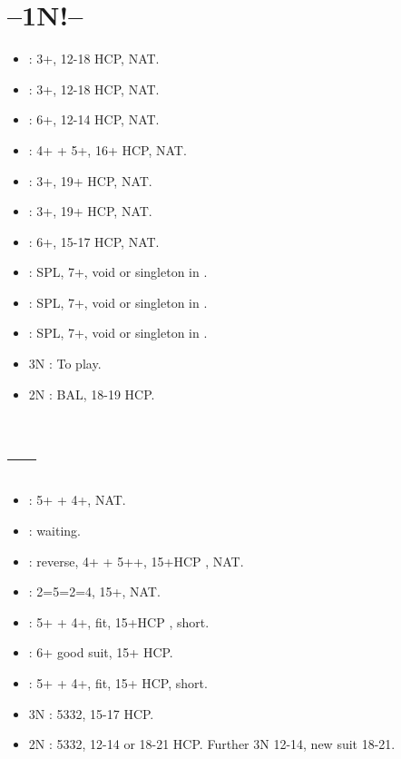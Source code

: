 \documentclass[12pt,twoside,a5paper]{report}%
\begin{document}
	\section*{--1N!--}
	\begin{itemize}
	\renewcommand{\labelitemi}{}
	\item {} : 3+\cl{}, 12-18 HCP, NAT.
	\item {} : 3+\di{}, 12-18 HCP, NAT.
	\item {} : 6+\he{}, 12-14 HCP, NAT.
	\item {} : 4+\sp{} + 5+\he{}, 16+ HCP, NAT.
	\item {} : 3+\cl{}, 19+ HCP, NAT.
	\item {} : 3+\di{}, 19+ HCP, NAT.
	\item {} : 6+\he{}, 15-17 HCP, NAT.
	\item {} : SPL, 7+\he{}, void or singleton in \sp{}. 
	\item {} : SPL, 7+\he{}, void or singleton in \cl{}.
	\item {} : SPL, 7+\he{}, void or singleton in \di{}.
	\item 3N : To play.
	\item 2N : BAL, 18-19 HCP.
	\end{itemize}

	\section*{----}
	\begin{itemize}
	\renewcommand{\labelitemi}{}
	\item {} : 5+\he{} + 4+\di{}, NAT.
	\item {} : waiting.
	\item {} : reverse, 4+\sp{} + 5+\he{}+, 15+HCP , NAT.
	\item {} : 2=5=2=4, 15+, NAT.
	\item {} : 5+\he{} + 4+\cl{}, fit, 15+HCP , short\di{}.
	\item {} : 6+\he{} good suit, 15+ HCP.
	\item {} : 5+\he{} + 4+\cl{}, fit, 15+ HCP, short\sp{}.
	\item 3N : 5332, 15-17 HCP.
	\item 2N : 5332, 12-14 or 18-21 HCP. Further 3N 12-14, new suit 18-21.
	\end{itemize}
\end{document}
